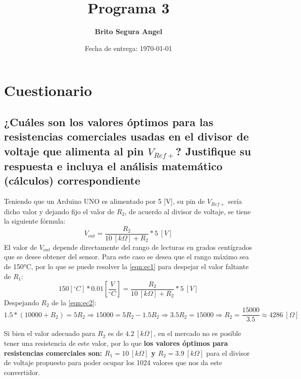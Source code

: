 \documentclass[letterpaper,10.5pt]{article} %
\title{Programa 3}
\author{\textbf{Brito Segura Angel}}
\date{Fecha de entrega: \today}
\begin{document}
    \pagestyle{fancy} %
    \maketitle %
    
    \section{Cuestionario}
    \subsection{¿Cuáles son los valores óptimos para las resistencias comerciales usadas en el divisor de voltaje que alimenta al pin $V_{Ref+}$? Justifique su respuesta e incluya el análisis matemático (cálculos) correspondiente}
	    Teniendo que un Arduino UNO es alimentado por 5 [V], su pin de $V_{Ref+}$ sería dicho valor y dejando fijo el valor de $R_2$, de acuerdo al divisor de voltaje, se tiene la siguiente fórmula:
	    \begin{equation}
			\label{eqn:ec1}
			V_{out} = \frac{R_2}{10~[k\Omega] + R_2} * 5~[V]
		\end{equation}
		El valor de $V_{out}$ depende directamente del rango de lecturas en grados centígrados que se desee obtener del sensor. Para este caso se desea que el rango máximo sea de 150°C, por lo que se puede resolver la \cref{eqn:ec1} para despejar el valor faltante de $R_1$:
		\begin{equation}
			\label{eqn:ec2}
			150[^{\circ} C]* 0.01\left[\frac{V}{^{\circ} C}\right] = \frac{R_2}{10~[k\Omega] + R_2} * 5~[V]
		\end{equation}
		Despejando $R_2$ de la \cref{eqn:ec2}:
		\[
			1.5 * (10000 + R_2) = 5R_2 \Rightarrow 15000 = 5R_2 - 1.5R_2 \Rightarrow 3.5R_2 = 15000 \Rightarrow R_2 = \frac{15000}{3.5}\approx 4286~[\Omega]
		\]

		Si bien el valor adecuado para $R_2$ es de $4.2~[k\Omega]$, en el mercado \cite{res_comerciales} no es posible tener una resistencia de este valor, por lo que \textbf{los valores óptimos para resistencias comerciales son: $R_1 = 10~[k\Omega]$ y $R_2 = 3.9~[k\Omega]$} para el divisor de voltaje propuesto para poder ocupar los 1024 valores que nos da este convertidor.\newline
\end{document}
